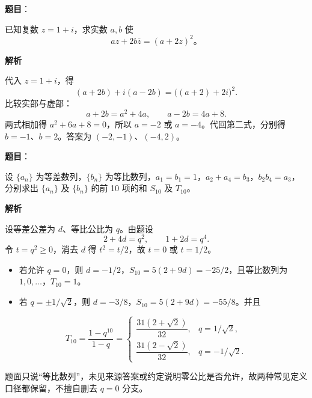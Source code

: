 \begin{answer}

\textbf{题目}：

已知复数 $z=1+i$，求实数 $a,b$ 使
\nopagebreak[4]
\[az+2b\overline{z}=(a+2z)^2\text{。}\]

\textbf{解析}

代入 $z=1+i$，得
\nopagebreak[4]
\[
(a+2b)+i(a-2b)=\bigl((a+2)+2i\bigr)^2.
\]
比较实部与虚部：
\nopagebreak[4]
\[
a+2b=a^2+4a,\qquad a-2b=4a+8.
\]
两式相加得 $a^2+6a+8=0$，所以 $a=-2$ 或 $a=-4$。代回第二式，分别得 $b=-1$、$b=2$。答案为 $(-2,-1)$、$(-4,2)$。


\end{answer}
\begin{answer}

\textbf{题目}：

设 $\{a_n\}$ 为等差数列，$\{b_n\}$ 为等比数列，$a_1=b_1=1$，$a_2+a_4=b_3$，$b_2b_4=a_3$，分别求出 $\{a_n\}$ 及 $\{b_n\}$ 的前 10 项的和 $S_{10}$ 及 $T_{10}$。

\textbf{解析}

设等差公差为 $d$、等比公比为 $q$。由题设
\nopagebreak[4]
\[
2+4d=q^2,\qquad 1+2d=q^4.
\]
令 $t=q^2\geqslant0$，消去 $d$ 得 $t^2=t/2$，故 $t=0$ 或 $t=1/2$。

\begin{itemize}
\item 若允许 $q=0$，则 $d=-1/2$，$S_{10}=5(2+9d)=-25/2$，且等比数列为 $1,0,\ldots$，$T_{10}=1$。
\item 若 $q=\pm1/\sqrt2$，则 $d=-3/8$，$S_{10}=5(2+9d)=-55/8$。并且
\end{itemize}
\nopagebreak[4]
\[
  T_{10}=\frac{1-q^{10}}{1-q}=\begin{cases}
  \dfrac{31(2+\sqrt2)}{32},&q=1/\sqrt2,\\[3pt]
  \dfrac{31(2-\sqrt2)}{32},&q=-1/\sqrt2.
  \end{cases}
\]

题面只说“等比数列”，未见来源答案或约定说明零公比是否允许，故两种常见定义口径都保留，不擅自删去 $q=0$ 分支。


\end{answer}
